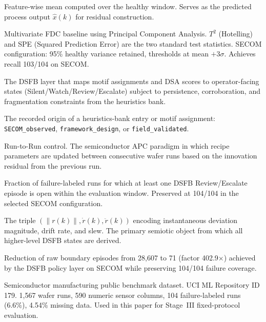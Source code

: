 \documentclass[11pt,letterpaper]{article}
\theoremstyle{scresult}
\begin{document}
\begin{description}[leftmargin=2.4cm, labelwidth=2.2cm, style=nextline,
                    itemsep=4pt, parsep=0pt]
\item[\textbf{Nominal reference} ($\hat{x}$)]
Feature-wise mean computed over the healthy window.  Serves as the predicted
process output $\hat{x}(k)$ for residual construction.

\item[\textbf{PCA T$^2$/SPE}]
Multivariate FDC baseline using Principal Component Analysis.
$T^2$ (Hotelling) and SPE (Squared Prediction Error) are the two standard
test statistics.  SECOM configuration: 95\% healthy variance retained,
thresholds at mean $+3\sigma$.  Achieves recall 103/104 on SECOM.

\item[\textbf{Policy engine}]
The DSFB layer that maps motif assignments and DSA scores to operator-facing
states (Silent/Watch/Review/Escalate) subject to persistence, corroboration,
and fragmentation constraints from the heuristics bank.

\item[\textbf{Provenance}]
The recorded origin of a heuristics-bank entry or motif assignment:
\texttt{SECOM\_observed}, \texttt{framework\_design}, or
\texttt{field\_validated}.

\item[\textbf{R2R control}]
Run-to-Run control.  The semiconductor APC paradigm in which recipe
parameters are updated between consecutive wafer runs based on the innovation
residual from the previous run.

\item[\textbf{Recall}]
Fraction of failure-labeled runs for which at least one DSFB Review/Escalate
episode is open within the evaluation window.  Preserved at 104/104 in the
selected SECOM configuration.

\item[\textbf{Residual sign tuple} ($\sigma$)]
The triple $(\|r(k)\|,\dot{r}(k),\ddot{r}(k))$ encoding instantaneous
deviation magnitude, drift rate, and slew.  The primary semiotic object from
which all higher-level DSFB states are derived.

\item[\textbf{Review surface compression}]
Reduction of raw boundary episodes from 28,607 to 71 (factor 402.9$\times$)
achieved by the DSFB policy layer on SECOM while preserving 104/104 failure
coverage.

\item[\textbf{SECOM}]
Semiconductor manufacturing public benchmark dataset.  UCI ML Repository ID
179.  1,567 wafer runs, 590 numeric sensor columns, 104 failure-labeled runs
(6.6\%), 4.54\% missing data.  Used in this paper for Stage~III fixed-protocol
evaluation.


\end{description}
\end{document}
